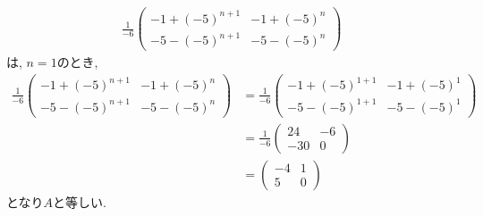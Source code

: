 \begin{checkanswer}%
  \begin{align*}
   \frac{1}{-6}\begin{pmatrix}-1+(-5)^{n+1}&-1+(-5)^n\\-5-(-5)^{n+1}&-5-(-5)^n\end{pmatrix}
  \end{align*}
  は, $n=1$のとき,
  \begin{align*}
    \frac{1}{-6}\begin{pmatrix}-1+(-5)^{n+1}&-1+(-5)^n\\-5-(-5)^{n+1}&-5-(-5)^n\end{pmatrix}
    &=\frac{1}{-6}\begin{pmatrix}-1+(-5)^{1+1}&-1+(-5)^1\\-5-(-5)^{1+1}&-5-(-5)^1\end{pmatrix}\\
    &=\frac{1}{-6}\begin{pmatrix}24&-6\\-30&0\end{pmatrix}\\
    &=\begin{pmatrix}-4&1\\5&0\end{pmatrix}
  \end{align*}
  となり$A$と等しい.


\end{checkanswer}
